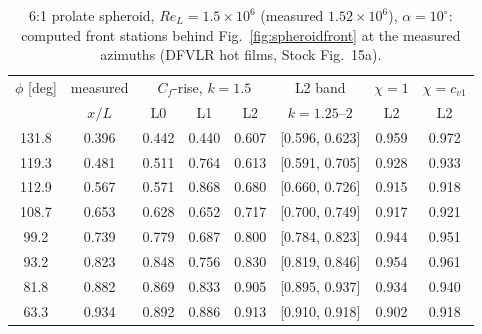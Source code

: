 \begin{table}[tp]
  \centering\small
  \caption{6:1 prolate spheroid, $Re_L\!=\!1.5\times10^6$ (measured $1.52\times10^6$), $\alpha\!=\!10^\circ$: computed front stations behind Fig.~\ref{fig:spheroidfront} at the measured azimuths (DFVLR hot films, Stock Fig.~15a).}
  \label{tab:data_spheroid}
  \begin{tabular}{cc ccc c cc}
    \toprule
    $\phi$ [deg] & measured & \multicolumn{3}{c}{$C_f$-rise, $k\!=\!1.5$} & L2 band & $\chi\!=\!1$ & $\chi\!=\!c_{v1}$ \\ & $x/L$ & L0 & L1 & L2 & $k\!=\!1.25$--$2$ & L2 & L2 \\
    \midrule
    131.8 & 0.396 & 0.442 & 0.440 & 0.607 & [0.596, 0.623] & 0.959 & 0.972 \\
    119.3 & 0.481 & 0.511 & 0.764 & 0.613 & [0.591, 0.705] & 0.928 & 0.933 \\
    112.9 & 0.567 & 0.571 & 0.868 & 0.680 & [0.660, 0.726] & 0.915 & 0.918 \\
    108.7 & 0.653 & 0.628 & 0.652 & 0.717 & [0.700, 0.749] & 0.917 & 0.921 \\
    99.2 & 0.739 & 0.779 & 0.687 & 0.800 & [0.784, 0.823] & 0.944 & 0.951 \\
    93.2 & 0.823 & 0.848 & 0.756 & 0.830 & [0.819, 0.846] & 0.954 & 0.961 \\
    81.8 & 0.882 & 0.869 & 0.833 & 0.905 & [0.895, 0.937] & 0.934 & 0.940 \\
    63.3 & 0.934 & 0.892 & 0.886 & 0.913 & [0.910, 0.918] & 0.902 & 0.918 \\
    \bottomrule
  \end{tabular}
\end{table}
